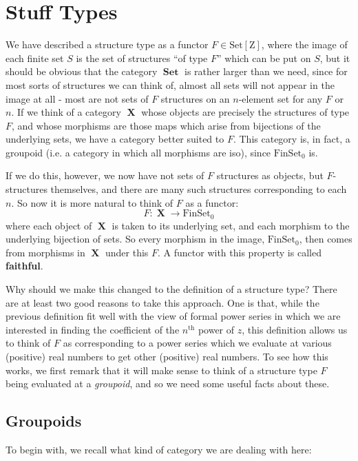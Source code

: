 \documentclass{amsart} \usepackage{amsmath,amssymb,bbm}
\newcommand{\opname}[1]{\operatorname{#1}}
\newcommand{\catname}[1]{\boldsymbol{\opname{{#1}}}}
\newcommand{\FSN}{\catname{FinSet_0}}
\newcommand{\Set}{\catname{Set}}
\newcommand{\SetZ}{\catname{Set [ Z ]}}
\begin{document}
\section{Stuff Types} \label{stuff-types-sec}

We have described a structure type as a functor $F \in \SetZ$, where
the image of each finite set $S$ is the set of structures ``of type
$F$'' which can be put on $S$, but it should be obvious that the
category $\Set$ is rather larger than we need, since for most sorts of
structures we can think of, almost all sets will not appear in the
image at all - most are not sets of $F$ structures on an $n$-element
set for any $F$ or $n$.  If we think of a category $\catname{X}$ whose objects
are precisely the structures of type $F$, and whose morphisms are
those maps which arise from bijections of the underlying sets, we have
a category better suited to $F$. This category is, in fact, a groupoid
(i.e. a category in which all morphisms are iso), since $\FSN$ is.

If we do this, however, we now have not sets of $F$ structures as objects, but
$F$-structures themselves, and there are many such structures corresponding to
each $n$.  So now it is more natural to think of $F$ as a functor:
\[ F : \catname{X} \rightarrow \FSN \]
where each object of $\catname{X}$ is taken to its underlying set, and each morphism to
the underlying bijection of sets.  So every morphism in the image,
$\text{$\FSN$}$, then comes from morphisms in $\catname{X}$ under
this $F$.  A functor with this property is called {\textbf{faithful}}.

Why should we make this changed to the definition of a structure type?  There
are at least two good reasons to take this approach.  One is that, while the
previous definition fit well with the view of formal power series in which we
are interested in finding the coefficient of the $n^{\opname{th}}$ power of $z$,
this definition allows us to think of $F$ as corresponding to a power series
which we evaluate at various (positive) real numbers to get other (positive)
real numbers.  To see how this works, we first remark that it will make sense
to think of a structure type $F$ being evaluated at a {\textit{groupoid}}, and so
we need some useful facts about these.

\subsection{Groupoids}

To begin with, we recall what kind of category we are dealing with here:
\end{document}
